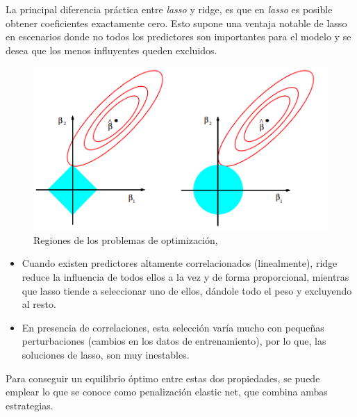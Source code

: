 \begin{frame}
    La principal diferencia práctica entre \textit{lasso} y ridge, es que en \textit{lasso} es posible obtener coeficientes exactamente cero. Esto supone una ventaja notable de lasso en escenarios donde no todos los predictores son importantes para el modelo y se desea que los menos influyentes queden excluidos.
\begin{figure}[H]
\centering
\includegraphics[scale=0.5]{figure/comparacion_regiones.png}
\caption{Regiones de los problemas de optimización, \citep{statisticallearning}}
\end{figure}

\end{frame}

\begin{frame}
\begin{itemize}
    \item Cuando existen predictores altamente correlacionados (linealmente), ridge reduce la influencia de todos ellos a la vez y de forma proporcional, mientras que lasso tiende a seleccionar uno de ellos, dándole todo el peso y excluyendo al resto.
    \item En presencia de correlaciones, esta selección varía mucho con pequeñas perturbaciones (cambios en los datos de entrenamiento), por lo que, las soluciones de lasso, son muy inestables.
\end{itemize}

Para conseguir un equilibrio óptimo entre estas dos propiedades, se puede emplear lo que se conoce como penalización elastic net, que combina ambas estrategias.
\end{frame}

